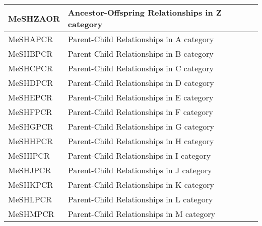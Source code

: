 \documentclass[11pt]{article}
\begin{document}
\begin{center}
\begin{table}[htbp]
\begin{tabular*}{150mm}{@{\extracolsep{\fill}}|p{40mm}|p{100mm}|}
      MeSHZAOR & Ancestor-Offspring Relationships in Z category \\ \hline \hline
      MeSHAPCR & Parent-Child Relationships in A category \\ \hline
      MeSHBPCR & Parent-Child Relationships in B category \\ \hline
      MeSHCPCR & Parent-Child Relationships in C category \\ \hline
      MeSHDPCR & Parent-Child Relationships in D category \\ \hline
      MeSHEPCR & Parent-Child Relationships in E category \\ \hline
      MeSHFPCR & Parent-Child Relationships in F category \\ \hline
      MeSHGPCR & Parent-Child Relationships in G category \\ \hline
      MeSHHPCR & Parent-Child Relationships in H category \\ \hline
      MeSHIPCR & Parent-Child Relationships in I category \\ \hline
      MeSHJPCR & Parent-Child Relationships in J category \\ \hline
      MeSHKPCR & Parent-Child Relationships in K category \\ \hline
      MeSHLPCR & Parent-Child Relationships in L category \\ \hline
      MeSHMPCR & Parent-Child Relationships in M category \\ \hline
    \end{tabular*}
  \end{table}
\end{center}
\end{document}
